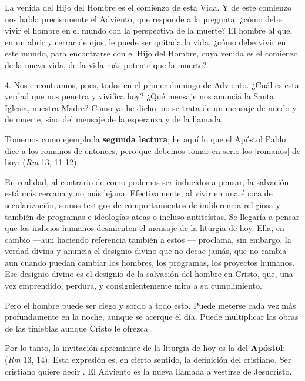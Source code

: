 \begin{body}
	La venida del Hijo del Hombre es el comienzo de esta Vida. Y de este comienzo nos habla precisamente el Adviento, que responde a la pregunta: ¿cómo debe vivir el hombre en el mundo con la perspectiva de la muerte? El hombre al que, en un abrir y cerrar de ojos, le puede ser quitada la vida, ¿cómo debe vivir en este mundo, para encontrarse con el Hijo del Hombre, cuya venida es el comienzo de la nueva vida, de la vida más potente que la muerte? 
	
	4. Nos encontramos, pues, todos en el primer domingo de Adviento. ¿Cuál es esta verdad que nos penetra y vivifica hoy? ¿Qué mensaje nos anuncia la Santa Iglesia, nuestra Madre? Como ya he dicho, no se trata de un mensaje de miedo y de muerte, sino del mensaje de la esperanza y de la llamada. 
	
	Tomemos como ejemplo la \textbf{segunda lectura}; he aquí lo que el Apóstol Pablo dice a los romanos de entonces, pero que debemos tomar en serio los [romanos] de hoy:  (\emph{Rm} 13, 11-12). 
	
	En realidad, al contrario de como podemos ser inducidos a pensar, la salvación está más cercana y no más lejana. Efectivamente, al vivir en una época de secularización, somos testigos de comportamientos de indiferencia religiosa y también de programas e ideologías ateas o incluso antiteístas. Se llegaría a pensar que los indicios humanos desmienten el mensaje de la liturgia de hoy. Ella, en cambio ---aun haciendo referencia también a estos --- proclama, sin embargo, la verdad divina y anuncia el designio divino que no decae jamás, que no cambia aun cuando puedan cambiar los hombres, los programas, los proyectos humanos. Ese designio divino es el designio de la salvación del hombre en Cristo, que, una vez emprendido, perdura, y consiguientemente mira a su cumplimiento. 
	
	Pero el hombre puede ser ciego y sordo a todo esto. Puede meterse cada vez más profundamente en la noche, aunque se acerque el día. Puede multiplicar las obras de las tinieblas aunque Cristo le ofrezca . 
	
	Por lo tanto, la invitación apremiante de la liturgia de hoy es la del \textbf{Apóstol}:  (\emph{Rm} 13, 14). Esta expresión es, en cierto sentido, la definición del cristiano. Ser cristiano quiere decir . El Adviento es la nueva llamada a vestirse de Jesucristo. 
	

\end{body}
